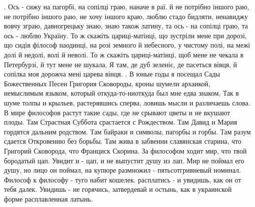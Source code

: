 \begin{multicols}{2}
\obeycr{}.
\smallskip
Ось - сижу на пагорбі, на сопілці граю,
наначе в раї. й не потрібно іншого раю,
не потрібно іншого раю, не хочу іншого краю,
\smallskip
люблю стадо бидляти, ненавиджу вовчу зграю,
давногрецьку знаю, знаю також латину,
та ось - на сопілці граю, та ось - люблю Україну.
\smallskip
То ж скажіть цариці-матінці, що зустріли мене при дорозі,
що сидів філософ наодинці, на розі
земного й небесного, у чистому полі,
на межі долі й недолі, волі й неволі.
\smallskip
То ж скажіть цариці-матінці, щоб мене не чекала
в Петербурзі, й тут мене не шукала,
Я там, де дуб зеленіє, де пасеться вівця,
й сопілка моя дорожча мені царева вінця.
.
\smallskip
В юные годы я посещал Сады
Божественных Песен Григория Сковороды,
кроны шумели архаикой, немыслимым языком,
который откуда-то-ниоткуда был мне едва знаком,
\smallskip
Так в шуме толпы и крыльев, растерявшись сперва,
ловишь мысли и различаешь слова.
В мире философов растут такие сады,
где не срывают цветы и не вкушают плоды.
\smallskip
Там Страстная Суббота срастается с Рождеством.
Там Давид и Мария гордятся дальним родством.
Там байраки и символы, пагорбы и горбы.
Там разум сдается Откровению без борьбы.
Там жива в забвении славянская старина,
что Григорий Сковорода, что Франциск Скорина.
\smallskip
За философом ходит мир, что твой бородатый цап.
Увидит и - цап, и не выпустит душу из лап.
Мир не поймал его душу, но лицо он поймал,
на купюре размножил - пятьсотгривневый номинал.
\smallskip
Философ к философу - туго набит кошелек.
расплатись - и увидишь, как он от тебя далек.
Увидишь - не горячись, затвердевай и остынь,
как в украинской форме расплавленная латынь.
\restorecr
\end{multicols}

